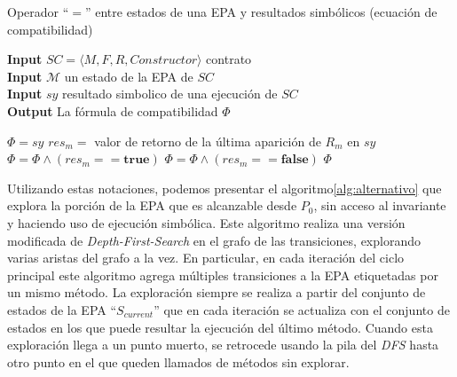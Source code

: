\begin{algorithm}[H]
    \captionsetup{belowskip=0pt}
    \caption{Operador ``$=$'' entre estados de una EPA y resultados simbólicos (ecuación de compatibilidad)}
    \hspace*{\algorithmicindent} \textbf{Input} $SC = \langle M, F, R, Constructor \rangle$ contrato \\
    \hspace*{\algorithmicindent} \textbf{Input} $\mathcal{M}$ un estado de la EPA de $SC$ \\
    \hspace*{\algorithmicindent} \textbf{Input} $sy$ resultado simbolico de una ejecución de $SC$ \\
    \hspace*{\algorithmicindent} \textbf{Output} La fórmula de compatibilidad $\Phi$
    \begin{algorithmic}[1]
        \State $\Phi = sy$
        \State $res_m =$ valor de retorno de la última aparición de $R_m$ en $sy$
        \State $\Phi = \Phi \land (res_m == \textbf{true})$
        \Else
        \State $\Phi = \Phi \land (res_m == \textbf{false})$
        \EndIf
        \EndFor
        \State \Return $\Phi$
    \end{algorithmic}
\end{algorithm}

Utilizando estas notaciones, podemos presentar el algoritmo\ref{alg:alternativo} que explora la porción de la EPA que es alcanzable desde $P_0$, sin acceso al invariante y haciendo uso de ejecución simbólica.
Este algoritmo realiza una versión	modificada de \textit{Depth-First-Search} en el grafo de las transiciones, explorando varias aristas del grafo a la vez.
En particular, en cada iteración del ciclo principal este algoritmo agrega múltiples transiciones a la EPA etiquetadas por un mismo método.
La exploración siempre se realiza a partir del conjunto de estados de la EPA ``$S_{current}$'' que en cada iteración se actualiza con el conjunto de estados en los que puede resultar la ejecución del último método.
Cuando esta exploración llega a un punto muerto, se retrocede usando la pila del \textit{DFS} hasta otro punto en el que queden llamados de métodos sin explorar.

%    

